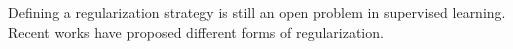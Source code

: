 Defining a regularization strategy is still an open problem in supervised learning. Recent works have proposed different forms of regularization.  











%
%
%



%










